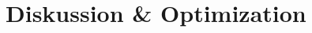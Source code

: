 \documentclass[../report.tex]{subfiles}
\begin{document}
\section{Diskussion \& Optimization}
\label{sec:optimering}
\end{document}
